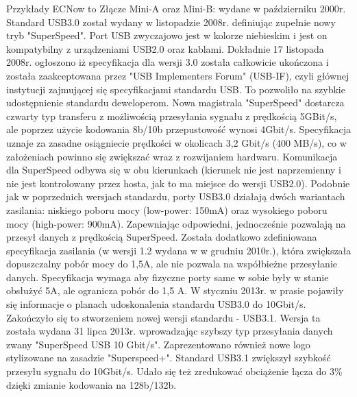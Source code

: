 \documentclass{BscUS}
\begin{document}
Przykłady ECNow to
Złącze Mini-A oraz Mini-B: wydane w październiku 2000r.\cite{USB20Doc}
\newline
\indent Standard USB3.0 został wydany w listopadzie 2008r. definiując zupełnie nowy tryb "SuperSpeed". Port USB zwyczajowo jest w kolorze niebieskim i jest on kompatybilny z urządzeniami USB2.0 oraz kablami.
Dokładnie 17 listopada 2008r. ogłoszono iż specyfikacja dla wersji 3.0 została całkowicie ukończona i została zaakceptowana przez "USB Implementers Forum" (USB-IF), czyli głównej instytucji zajmującej się specyfikacjami standardu USB. To pozwoliło na szybkie udostępnienie standardu deweloperom.
Nowa magistrala "SuperSpeed" dostarcza czwarty typ transferu z możliwością przesyłania sygnału z prędkością 5GBit/s, ale poprzez użycie kodowania 8b/10b przepustowość wynosi 4Gbit/s. Specyfikacja uznaje za zasadne osiągniecie prędkości w okolicach 3,2 Gbit/s (400 MB/s), co w założeniach powinno się zwiększać wraz z rozwijaniem hardwaru. Komunikacja dla SuperSpeed odbywa się w obu kierunkach (kierunek nie jest naprzemienny i nie jest kontrolowany przez hosta, jak to ma miejsce do wersji USB2.0).
Podobnie jak w poprzednich wersjach standardu, porty USB3.0 działają dwóch wariantach zasilania: niskiego poboru mocy (low-power: 150mA) oraz wysokiego poboru mocy (high-power: 900mA). Zapewniając odpowiedni, jednocześnie pozwalają na przesył danych z prędkością SuperSpeed.
Została dodatkowo zdefiniowana specyfikacja zasilania (w wersji 1.2 wydana w w grudniu 2010r.), która zwiększała dopuszczalny pobór mocy do 1,5A, ale nie pozwala na współbieżne przesyłanie danych. Specyfikacja wymaga aby fizyczne porty same w sobie były w stanie obsłużyć 5A, ale ogranicza pobór do 1,5 A.
\cite{USB30Doc}
\newline
\indent W styczniu 2013r. w prasie pojawiły się informacje o planach udoskonalenia standardu USB3.0 do 10Gbit/s. Zakończyło się to stworzeniem nowej wersji standardu - USB3.1. Wersja ta została wydana 31 lipca 2013r. wprowadzając szybszy typ przesyłania danych zwany "SuperSpeed USB 10 Gbit/s". Zaprezentowano również nowe logo stylizowane na zasadzie "Superspeed+". Standard USB3.1 zwiększył szybkość przesyłu sygnału do 10Gbit/s. Udało się też zredukować obciążenie łącza do 3\% dzięki zmianie kodowania na 128b/132b.
\end{document}
